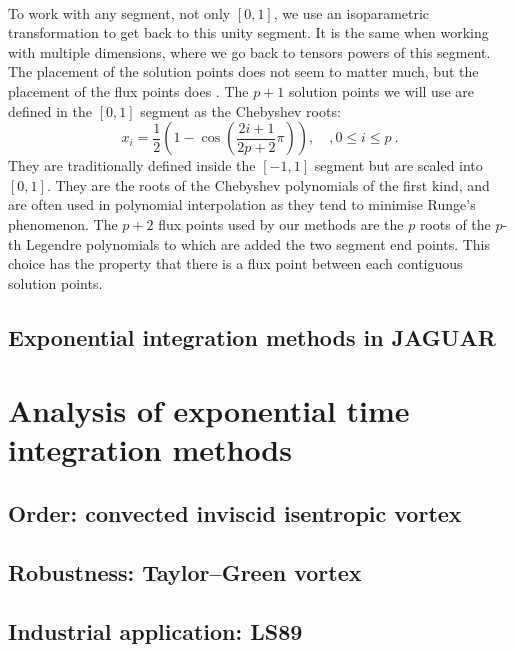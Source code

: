       \paragraph{}
      To work with any segment, not only $\left[0, 1\right]$, we use an isoparametric transformation to get back to this unity segment.
      It is the same when working with multiple dimensions, where we go back to tensors powers of this segment.
      The placement of the solution points does not seem to matter much, but the placement of the flux points does \cite{VandenAbeeleLacorWang2008}.
      The $p + 1$ solution points we will use are defined in the $\left[0, 1\right]$ segment as the Chebyshev roots:
      \begin{equation}
        x_i = \frac{1}{2} \left(1 - \cos\left(\frac{2i + 1}{2p + 2} \pi\right)\right), \quad, 0 \leq i \leq p \ .
      \end{equation}
      They are traditionally defined inside the $\left[-1, 1\right]$ segment but are scaled into $\left[0, 1\right]$.
      They are the roots of the Chebyshev polynomials of the first kind, and are often used in polynomial interpolation as they tend to minimise Runge's phenomenon.
      The $p + 2$ flux points used by our methods are the $p$ roots of the $p$-th Legendre polynomials to which are added the two segment end points.
      This choice has the property that there is a flux point between each contiguous solution points.



    \subsection{Exponential integration methods in JAGUAR}






  \section{Analysis of exponential time integration methods}

    \subsection{Order: convected inviscid isentropic vortex}
    \subsection{Robustness: Taylor--Green vortex}
    \subsection{Industrial application: LS89}
